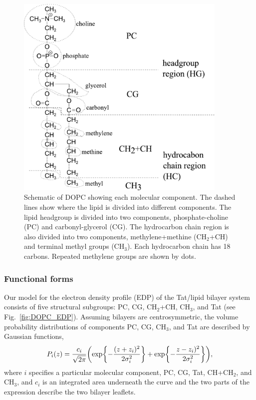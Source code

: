 \begin{figure}[htbp]
  \centering
  \includegraphics[width=0.9\textwidth]{figures/Tat/MMs/dopc_schematic.pdf}
  \caption[Schematic of DOPC showing each molecular component]
  {Schematic of DOPC showing each molecular component. The dashed lines 
  show where the lipid is divided into different components. 
  The lipid headgroup
  is divided into two components, phosphate-choline (PC) and carbonyl-glycerol (CG). 
  The hydrocarbon chain region is also divided
  into two components, methylene+methine (CH$_2$+CH) and terminal methyl groups (CH$_3$).
  Each hydrocarbon chain has 18 carbons. Repeated methylene groups 
  are shown by dots.}
  \label{fig:dopc_schematic}
\end{figure}

\subsubsection{Functional forms}
Our model for the electron density profile (EDP)
of the Tat/lipid bilayer system consists of five structural subgroups: PC, CG,
CH$_2$+CH, CH$_3$, and Tat (see Fig.~\ref{fig:DOPC_EDP}).
Assuming bilayers are centrosymmetric, 
the volume probability distributions of components PC, CG, CH$_3$, and Tat 
are described by Gaussian functions,
\begin{equation}
  P_i(z)=\frac{c_i}{\sqrt{2\pi}}\mathopen{}\left( 
    \exp\mathopen{}\left\lbrace -\frac{(z+z_i)^2}{2\sigma_i^2} \right\rbrace\mathclose{}
	+ \exp\mathopen{}\left\lbrace -\frac{z-z_i)^2}{2\sigma_i^2} \right\rbrace\mathclose{}
   \right)\mathclose{},
\end{equation}
where $i$ specifies a particular molecular component,
PC, CG, Tat, CH+CH$_2$, and CH$_3$, and
$c_i$ is an integrated area underneath the curve and the two parts of the 
expression describe the two bilayer leaflets. 

